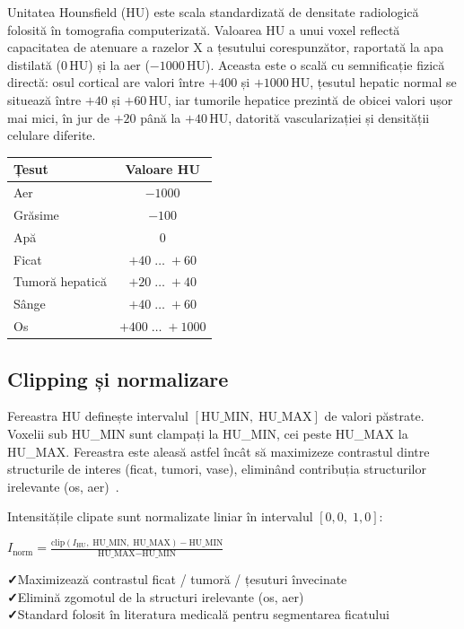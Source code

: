 \documentclass[12pt, a4paper]{report}
\newcommand{\pro}{\textcolor{accentgreen}{\textbf{✓}}\;}
\newcommand{\formula}[1]{%
    \begin{center}
        \colorbox{codebackground}{%
            \parbox{0.88\textwidth}{\centering\vspace{4pt}$#1$\vspace{4pt}}%
        }
    \end{center}
}
\begin{document}
Unitatea Hounsfield (HU) este scala standardizată de densitate radiologică folosită în tomografia computerizată.
Valoarea HU a unui voxel reflectă capacitatea de atenuare a razelor X a țesutului corespunzător,
raportată la apa distilată (0\,HU) și la aer ($-1000$\,HU). Aceasta este o scală cu semnificație fizică directă:
osul cortical are valori între $+400$ și $+1000$\,HU, țesutul hepatic normal se situează între
$+40$ și $+60$\,HU, iar tumorile hepatice prezintă de obicei valori ușor mai mici,
în jur de $+20$ până la $+40$\,HU, datorită vascularizației și densității celulare diferite.

\begin{center}
\begin{tabular}{lc}
    \toprule
    \textbf{Țesut} & \textbf{Valoare HU} \\
    \midrule
    Aer         & $-1000$ \\
    Grăsime     & $-100$  \\
    Apă         & $0$     \\
    Ficat       & $+40 \;\ldots\; +60$ \\
    Tumoră hepatică & $+20 \;\ldots\; +40$ \\
    Sânge       & $+40 \;\ldots\; +60$ \\
    Os          & $+400 \;\ldots\; +1000$ \\
    \bottomrule
\end{tabular}
\end{center}

\subsection{Clipping și normalizare}
\label{sec:clipping_normalizare}

Fereastra HU definește intervalul $[\text{HU\_MIN},\; \text{HU\_MAX}]$ de valori păstrate.
Voxelii sub HU\_MIN sunt clampați la HU\_MIN, cei peste HU\_MAX la HU\_MAX. Fereastra este
aleasă astfel încât să maximizeze contrastul dintre structurile de interes (ficat, tumori,
vase), eliminând contribuția structurilor irelevante (os, aer)~\cite{isensee2019automated, weihsbach2023windowshift}.

Intensitățile clipate sunt normalizate liniar în intervalul $[0{,}0,\; 1{,}0]$:

\formula{
    I_{\text{norm}} = \frac{\text{clip}(I_{\text{HU}},\; \text{HU\_MIN},\; \text{HU\_MAX}) - \text{HU\_MIN}}{\text{HU\_MAX} - \text{HU\_MIN}}
}

\begin{goodbox}
\pro Maximizează contrastul ficat / tumoră / țesuturi învecinate \\
\pro Elimină zgomotul de la structuri irelevante (os, aer) \\
\pro Standard folosit în literatura medicală pentru segmentarea ficatului
\end{goodbox}
\end{document}
